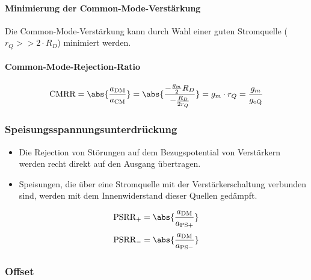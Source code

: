 \paragraph{Minimierung der Common-Mode-Verstärkung}
Die Common-Mode-Verstärkung kann durch Wahl einer guten Stromquelle ($r_Q >> 2 \cdot R_D$) minimiert werden.

\paragraph{Common-Mode-Rejection-Ratio}

\vspace{-0.2cm}

\[
    \text{CMRR} = \abs{\frac{a_{\rm DM}}{a_{\rm CM}}} = \abs{\frac{-\frac{g_m}{2} R_D}{- \frac{R_D}{2 r_Q}}} = g_m \cdot r_Q = \frac{g_m}{g_{\rm oQ}}
\]

\subsubsection{Speisungsspannungsunterdrückung}


\begin{minipage}[c]{0.68\columnwidth}
    \begin{itemize}
        \item Die Rejection von Störungen auf dem Bezugspotential von Verstärkern werden recht direkt auf den Ausgang übertragen.
        \item Speisungen, die über eine Stromquelle mit der Verstärkerschaltung verbunden sind, werden mit dem Innenwiderstand dieser Quellen gedämpft.
    \end{itemize}
\end{minipage}
\hfill
\begin{minipage}[c]{0.3\columnwidth}
    \[
        \text{PSRR}_+ = \abs{\frac{a_{\rm DM}}{a_{\rm PS+}}}
    \]
    \[
        \text{PSRR}_- = \abs{\frac{a_{\rm DM}}{a_{\rm PS-}}}
    \]
\end{minipage}


\subsubsection{Offset}

